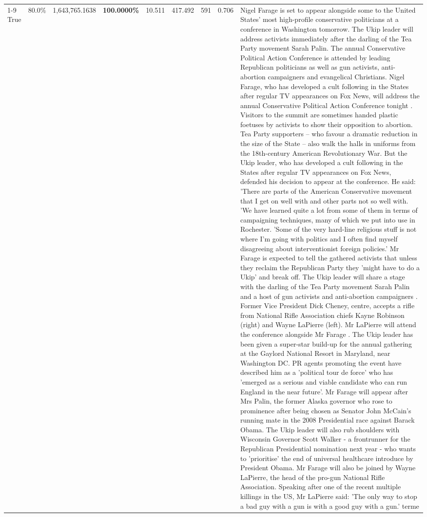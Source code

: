 \begin{table}[H]
\begin{tabular}{lllrlllll}
\cline{1-9}
True & 80.0\% & 1,643,765.1638 & \bfseries \color{red} 100.0000\% & 10.511 & 417.492 & 591 & 0.706 & Nigel Farage is set to appear alongside some to the United States' most high-profile conservative politicians at a conference in Washington tomorrow. The Ukip leader will address activists immediately after the darling of the Tea Party movement Sarah Palin. The annual Conservative Political Action Conference is attended by leading Republican politicians as well as gun activists, anti-abortion campaigners and evangelical Christians. Nigel Farage, who has developed a cult following in the States after regular TV appearances on Fox News, will address the annual Conservative Political Action Conference tonight . Visitors to the summit are sometimes handed plastic foetuses by activists to show their opposition to abortion. Tea Party supporters – who favour a dramatic reduction in the size of the State – also walk the halls in uniforms from the 18th-century American Revolutionary War. But the Ukip leader, who has developed a cult following in the States after regular TV appearances on Fox News, defended his decision to appear at the conference. He said: 'There are parts of the American Conservative movement that I get on well with and other parts not so well with. 'We have learned quite a lot from some of them in terms of campaigning techniques, many of which we put into use in Rochester. 'Some of the very hard-line religious stuff is not where I'm going with politics and I often find myself disagreeing about interventionist foreign policies.' Mr Farage is expected to tell the gathered activists that unless they reclaim the Republican Party they 'might have to do a Ukip' and break off. The Ukip leader will share a stage with the darling of the Tea Party movement Sarah Palin and a host of gun activists and anti-abortion campaigners . Former Vice President Dick Cheney, centre, accepts a rifle from National Rifle Association chiefs Kayne Robinson (right) and Wayne LaPierre (left). Mr LaPierre will attend the conference alongside Mr Farage . The Ukip leader has been given a super-star build-up for the annual gathering at the Gaylord National Resort in Maryland, near Washington DC. PR agents promoting the event have described him as a 'political tour de force' who has 'emerged as a serious and viable candidate who can run England in the near future'. Mr Farage will appear after Mrs Palin, the former Alaska governor who rose to prominence after being chosen as Senator John McCain's running mate in the 2008 Presidential race against Barack Obama. The Ukip leader will also rub shoulders with Wisconsin Governor Scott Walker - a frontrunner for the Republican Presidential nomination next year - who wants to 'prioritise' the end of universal healthcare introduce by President Obama. Mr Farage will also be joined by Wayne LaPierre, the head of the pro-gun National Rifle Association. Speaking after one of the recent multiple killings in the US, Mr LaPierre said: 'The only way to stop a bad guy with a gun is with a good guy with a gun.' terme \\

\end{tabular}
\end{table}
